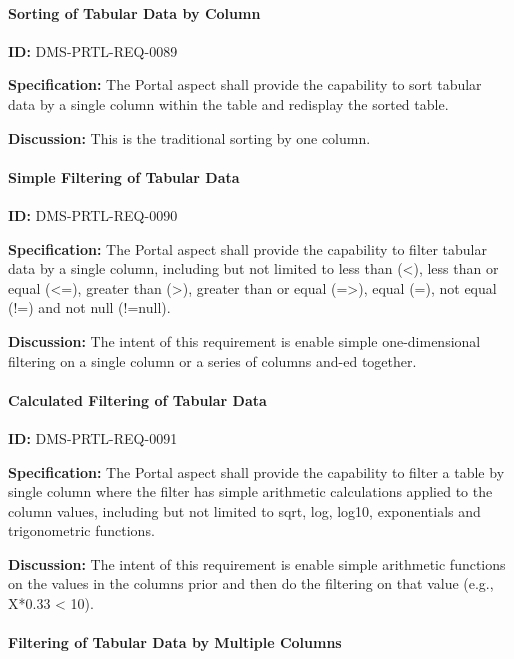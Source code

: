 \documentclass[SE,toc]{lsstdoc}
\begin{document}
\paragraph{Sorting of Tabular Data by Column}\hfill  %

\label{DMS-PRTL-REQ-0089}
\textbf{ID:} DMS-PRTL-REQ-0089

\textbf{Specification:}
The Portal aspect shall provide the capability to sort tabular data by a single column within the table and redisplay the sorted table.

\textbf{Discussion:}
This is the traditional sorting by one column.

\paragraph{Simple Filtering of Tabular Data}\hfill  %

\label{DMS-PRTL-REQ-0090}
\textbf{ID:} DMS-PRTL-REQ-0090

\textbf{Specification:}
The Portal aspect shall provide the capability to filter tabular data by a single column, including but not limited to less than (<), less than or equal (<=), greater than (>), greater than or equal (=>), equal (=), not equal (!=) and not null (!=null).

\textbf{Discussion:}
The intent of this requirement is enable simple one-dimensional filtering on a single column or a series of columns and-ed together.

\paragraph{Calculated Filtering of Tabular Data}\hfill  %

\label{DMS-PRTL-REQ-0091}
\textbf{ID:} DMS-PRTL-REQ-0091

\textbf{Specification:}
The Portal aspect shall provide the capability to filter a table by single column where the filter has simple arithmetic calculations applied to the column values, including but not limited to sqrt, log, log10, exponentials and trigonometric functions.

\textbf{Discussion:}
The intent of this requirement is enable simple arithmetic functions on the values in the columns prior and then do the filtering on that value (e.g., X*0.33 < 10).

\paragraph{Filtering of Tabular Data by Multiple Columns}\hfill  %
\end{document}
